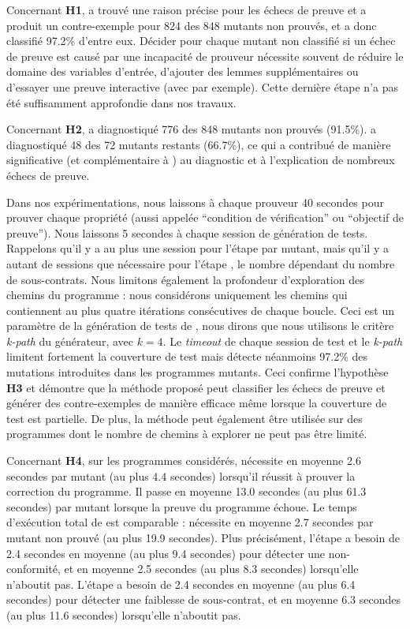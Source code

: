 Concernant \textbf{H1}, \stady a trouvé une raison précise pour les échecs de
preuve et a produit un contre-exemple pour 824 des 848 mutants non prouvés, et
a donc classifié 97.2\% d'entre eux.
Décider pour chaque mutant non classifié si un échec de preuve est causé par une
incapacité de prouveur nécessite souvent de réduire le domaine des variables
d'entrée, d'ajouter des lemmes supplémentaires ou d'essayer une preuve
interactive (avec \coq par exemple).
Cette dernière étape n'a pas été suffisamment approfondie dans nos travaux.

Concernant \textbf{H2}, \NCD a diagnostiqué 776 des 848 mutants non prouvés
(91.5\%).
\SWD a diagnostiqué 48 des 72 mutants restants (66.7\%), ce qui a contribué
de manière significative (et complémentaire à \NCD) au diagnostic et à
l'explication de nombreux échecs de preuve.

Dans nos expérimentations, nous laissons à chaque prouveur 40 secondes pour
prouver chaque propriété (aussi appelée ``condition de vérification'' ou
``objectif de preuve'').
Nous laissons 5 secondes à chaque session de génération de tests.
Rappelons qu'il y a au plus une session pour l'étape \NCD par mutant, mais
qu'il y a autant de sessions que nécessaire pour l'étape \SWD, le nombre
dépendant du nombre de sous-contrats.
Nous limitons également la profondeur d'exploration des chemins du programme :
nous considérons uniquement les chemins qui contiennent au plus quatre
itérations consécutives de chaque boucle.
Ceci est un paramètre de la génération de tests de \pathcrawler, nous dirons
que nous utilisons le critère {\em k-path} du générateur, avec $k = 4$.
Le {\em timeout} de chaque session de test et le {\em k-path} limitent
fortement la couverture de test mais \stady détecte néanmoins 97.2\% des
mutations introduites dans les programmes mutants.
Ceci confirme l'hypothèse \textbf{H3} et démontre que la méthode proposé peut
classifier les échecs de preuve et générer des contre-exemples de manière
efficace même lorsque la couverture de test est partielle.
De plus, la méthode peut également être utilisée sur des programmes dont le
nombre de chemins à explorer ne peut pas être limité.

Concernant \textbf{H4}, sur les programmes considérés, \Wp nécessite en moyenne
2.6 secondes par mutant (au plus 4.4 secondes) lorsqu'il réussit à prouver la
correction du programme.
Il passe en moyenne 13.0 secondes (au plus 61.3 secondes) par mutant lorsque la
preuve du programme échoue.
Le temps d'exécution total de \stady est comparable : \stady nécessite en
moyenne 2.7 secondes par mutant non prouvé (au plus 19.9 secondes).
Plus précisément, l'étape \NCD a besoin de 2.4 secondes en moyenne (au plus 9.4
secondes) pour détecter une non-conformité, et en moyenne 2.5 secondes (au plus
8.3 secondes) lorsqu'elle n'aboutit pas.
L'étape \SWD a besoin de 2.4 secondes en moyenne (au plus 6.4 secondes) pour
détecter une faiblesse de sous-contrat, et en moyenne 6.3 secondes (au plus 11.6
secondes) lorsqu'elle n'aboutit pas.


